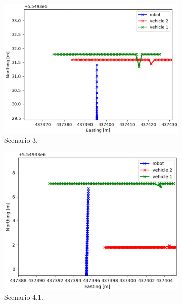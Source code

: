 \begin{figure}[H]
            \begin{subfigure}{0.32\linewidth}
                \centering
                \includegraphics[width=\linewidth]{images/simulations/closest_3.png}
                \caption{Scenario 3.}
            \end{subfigure}
            \begin{subfigure}{0.32\linewidth}
                \centering
                \includegraphics[width=\linewidth]{images/simulations/closest_4_1.png}
                \caption{Scenario 4.1.}
            \end{subfigure}
            \begin{subfigure}{0.32\linewidth}
                \centering

\end{subfigure}
\end{figure}

